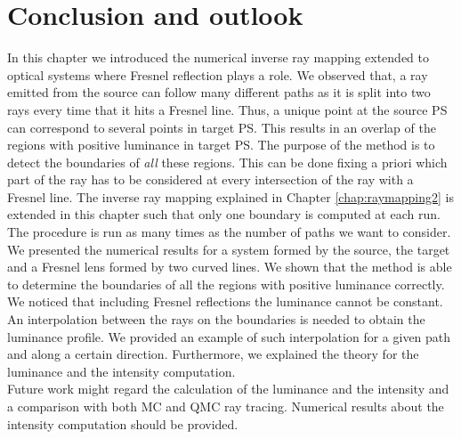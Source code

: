 \section{Conclusion and outlook}
In this chapter we introduced the numerical inverse ray mapping extended to optical systems where Fresnel reflection plays a role. We observed that, a ray emitted from the source can follow many different paths as it is split into two rays every time that it hits a Fresnel line. Thus, a unique point at the source PS can correspond to several points in target PS. This results in an overlap of the regions with positive luminance in target PS. The purpose of the method is to detect the boundaries of \textit{all} these regions. This can be done fixing a priori which part of the ray has to be considered at every intersection of the ray with a Fresnel line. The inverse ray mapping explained in Chapter \ref{chap:raymapping2} is extended in this chapter such that only one boundary is computed at each run. The procedure is run as many times as the number of paths we want to consider. We presented the numerical results for a system formed by the source, the target and a Fresnel lens formed by two curved lines. We shown that the method is able to determine the boundaries of all the regions with positive luminance correctly. We noticed that including Fresnel reflections the luminance cannot be constant. An interpolation between the rays on the boundaries is needed to obtain the luminance profile. We provided an example of such interpolation for a given path and along a certain direction. Furthermore, we explained the theory for the luminance and the intensity computation. \\ \indent
Future work might regard the calculation of the luminance and the intensity and a comparison with both MC and QMC ray tracing. Numerical results about the intensity computation should be provided.





